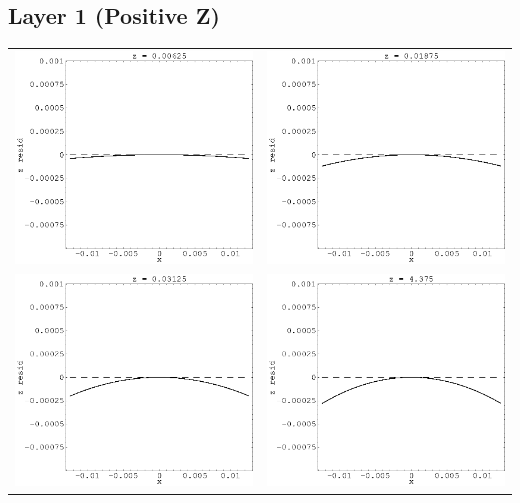 \documentclass[12pt]{article}
\begin{document}
\pagebreak

\subsection*{Layer 1 (Positive Z)}
  \begin{tabular}{c c}
    \includegraphics[width=7.3 cm]{layer1_left1.eps} &
    \includegraphics[width=7.3 cm]{layer1_left2.eps} \\
    \includegraphics[width=7.3 cm]{layer1_left3.eps} &
    \includegraphics[width=7.3 cm]{layer1_left4.eps} \\
  \end{tabular}
\end{document}
